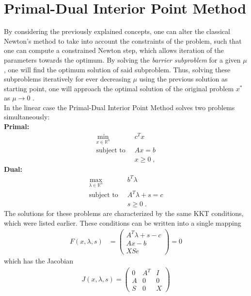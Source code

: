 \section{Primal-Dual Interior Point Method}
By considering the previously explained concepts, one can alter the classical Newton's method to take into account the constraints of the problem, such that one can compute a constrained Newton step, which allows iteration of the parameters towards the optimum.
By solving the \textit{barrier subproblem} for a given $\mu$, one will find the optimum solution of said subproblem. Thus, solving these subproblems iteratively for ever decreasing $\mu$ using the previous solution as starting point, one will approach the optimal solution of the original problem $x^*$ as $\mu \to 0$ \cite{ipopt}.\\
In the linear case the Primal-Dual Interior Point Method solves two problems  simultaneously:\\
\textbf{Primal:}
 \begin{align*}
	\min_{x \in \mathbb{R}^n} \;  & \; c^T x \\
	\text{subject to} \;  & \; A x = b  \\
							& \; x \geq 0 \; ,
\end{align*}
\textbf{Dual:} 
\begin{align*}
	\max_{\lambda \in \mathbb{R}^n} \;  & \; b^T \lambda \\
	\text{subject to} \;  & \; A^T \lambda + s = c  \\
							& \; s \geq 0 \; .
\end{align*}
The solutions for these problems are characterized by the same KKT conditions, which were listed earlier. These conditions can be written into a single mapping
 \begin{align}
    F(x , \lambda, s) &= \begin{pmatrix}
           A^T \lambda + s - c \\
           A x - b \\
           X S e
         \end{pmatrix} = 0
  \end{align}
  which has the Jacobian
 \begin{align}
    J(x , \lambda, s) = \begin{pmatrix}
           0 & A^T & I	\\
           A & 0 & 0 	\\
           S & 0 & X
         \end{pmatrix}
  \end{align}
